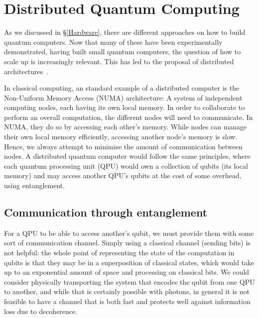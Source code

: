 \chapter{Distributed Quantum Computing}
\label{chap:Distributed}

As we discussed in \S\ref{Hardware}, there are different approaches on how to build quantum computers. Now that many of these have been experimentally demonstrated, having built small quantum computers, the question of how to scale up is increasingly relevant. This has led to the proposal of distributed architectures~\citep{ArchitectureSurvey}.

In classical computing, an standard example of a distributed computer is the Non-Uniform Memory Access (NUMA) architecture: A system of independent computing nodes, each having its own local memory. In order to collaborate to perform an overall computation, the different nodes will need to communicate. In NUMA, they do so by accessing each other's memory. While nodes can manage their own local memory efficiently, accessing another node's memory is slow. Hence, we always attempt to minimise the amount of communication between nodes. A distributed quantum computer would follow the same principles, where each quantum processing unit (QPU) would own a collection of qubits (its local memory) and may access another QPU's qubits at the cost of some overhead, using entanglement.

\section{Communication through entanglement}
\label{Ebits}

For a QPU to be able to access another's qubit, we must provide them with some sort of communication channel. Simply using a classical channel (sending bits) is not helpful: the whole point of representing the state of the computation in qubits is that they may be in a superposition of classical states, which would take up to an exponential amount of space and processing on classical bits. We could consider physically transporting the system that encodes the qubit from one QPU to another, and while that is certainly possible with photons, in general it is not feasible to have a channel that is both fast and protects well against information loss due to decoherence.

